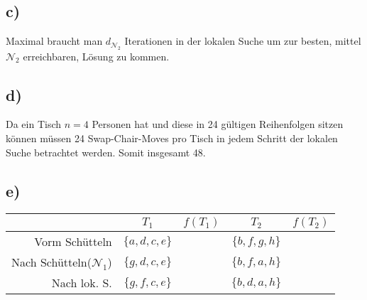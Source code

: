 \documentclass[12pt]{article}
\begin{document}
	\subsection*{c)}
		Maximal braucht man $d_{\mathcal{N}_2}$ Iterationen in der lokalen Suche um zur besten, mittel $\mathcal{N}_2$ erreichbaren, Lösung zu kommen.
	\subsection*{d)}
		Da ein Tisch $n=4$ Personen hat und diese in 24 gültigen Reihenfolgen sitzen können müssen 24 Swap-Chair-Moves pro Tisch in jedem Schritt der lokalen Suche betrachtet werden. Somit insgesamt 48.
	\subsection*{e)}
		
		\begin{tabular}{r | c c c c}
			& $T_1$ & $f(T_1)$ & $T_2$ & $f(T_2)$ \\ \hline
			Vorm Schütteln & $\{a,d,c,e\}$ & & $ \{b,f,g,h\}$ & \\
			Nach Schütteln($\mathcal{N}_1$) & $\{g,d,c,e\}$ & & $ \{b,f,a,h\}$ & \\
			Nach lok. S. & $\{g,f,c,e\}$ & & $ \{b,d,a,h\}$ & \\
		\end{tabular}
		
		
		
\end{document}
